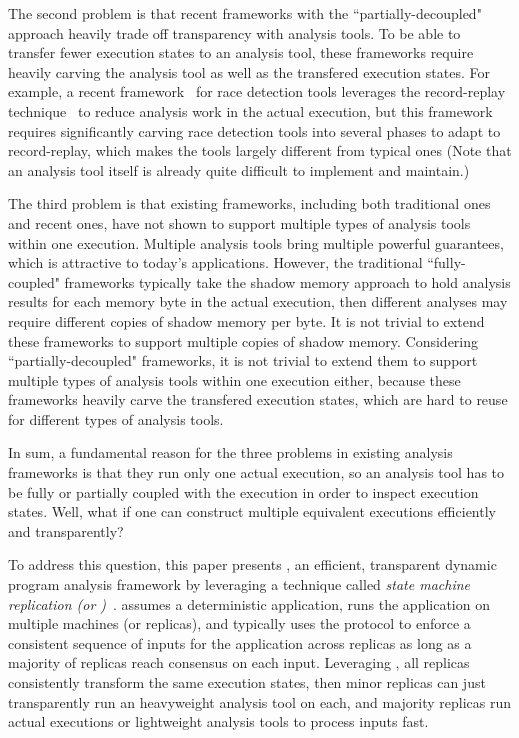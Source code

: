 The second problem is that recent frameworks with the ``partially-decoupled"
approach heavily trade off transparency with analysis tools. To be able to
transfer fewer execution states to an analysis tool, these frameworks require
heavily carving the analysis tool as well as the transfered execution states.
For example, a recent framework~\cite{wester:parallelizing:asplos13} for race
detection tools leverages the record-replay
technique~\cite{scribe:sigmetrics2010, respec:asplos10, racepro:sosp11} to
reduce analysis work in the actual execution, but this framework
requires significantly carving race detection tools into several phases to adapt
to record-replay, which makes the tools largely different from typical ones
(Note that an analysis tool itself is already quite difficult to implement and
maintain.)


The third problem is that existing frameworks, including both traditional ones
and recent ones, have not shown to support multiple types of analysis tools
within one execution. Multiple analysis tools bring multiple powerful
guarantees, which is attractive to today's applications. However, the
traditional ``fully-coupled" frameworks typically take the shadow memory
approach to hold analysis results for each memory byte in the actual execution,
then different analyses may require different copies of shadow memory per byte.
It is not trivial to extend these frameworks to support multiple copies of
shadow memory. Considering ``partially-decoupled" frameworks, it is not trivial
to extend them to support multiple types of analysis tools within one execution
either, because these frameworks heavily carve the transfered execution states,
which are hard to reuse for different types of analysis tools.


In sum, a fundamental reason for the three problems in existing analysis 
frameworks is that they run only one actual execution, so an analysis tool has
to be fully or partially coupled with the execution in order to inspect
execution states. Well, what if one can construct multiple equivalent
executions efficiently and transparently?




To address this question, this paper presents \xxx, an efficient, 
transparent dynamic program analysis framework by leveraging a technique called 
\emph{state machine replication (or \smr)}~\cite{paxos:simple, 
paxos:practical, paxos}. \smr assumes a deterministic application, runs the 
application on multiple machines (or replicas), and typically uses the \paxos 
protocol to enforce a consistent sequence of inputs for the application across 
replicas as long as a majority of replicas reach consensus on each input. 
Leveraging \smr, all replicas consistently transform the same execution states, 
then minor replicas can just transparently run an heavyweight analysis tool on 
each, and majority replicas run actual executions or lightweight analysis tools 
to process inputs fast.


